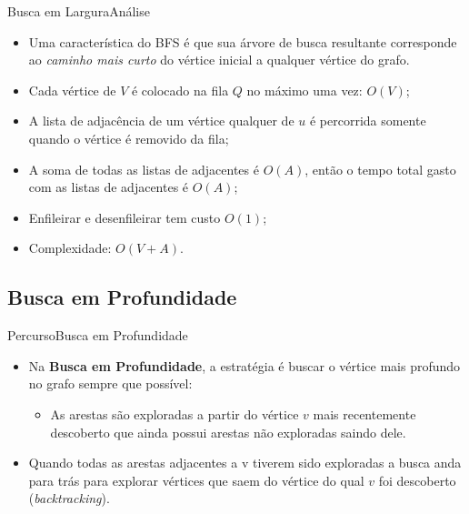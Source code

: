 \documentclass[aspectratio=169]{beamer}
\begin{document}

\begin{frame}{Busca em Largura}{Análise}
\begin{itemize}
\item Uma característica do BFS é que sua árvore de busca resultante corresponde ao {\it caminho mais curto} do vértice inicial a qualquer vértice do grafo.
\item Cada vértice de $V$ é colocado na fila $Q$ no máximo uma vez: $O(V)$;
\item A lista de adjacência de um vértice qualquer de $u$ é percorrida somente quando o vértice é removido da fila;
\item A soma de todas as listas de adjacentes é $O(A)$, então o tempo total gasto com as listas de adjacentes é $O(A)$;
\item Enfileirar e desenfileirar tem custo $O(1)$;
\item Complexidade: $O(V + A)$.
\end{itemize}
\end{frame}

\subsection{Busca em Profundidade}

\begin{frame}{Percurso}{Busca em Profundidade}
\begin{itemize}
\item Na {\bf Busca em Profundidade}, a estratégia é buscar o vértice mais profundo no grafo sempre que possível:
\begin{itemize}
\item As arestas são exploradas a partir do vértice $v$ mais recentemente descoberto que ainda possui arestas não exploradas saindo dele.
\end{itemize}
\item Quando todas as arestas adjacentes a v tiverem sido exploradas a busca anda para trás para explorar vértices que
saem do vértice do qual $v$ foi descoberto ({\it backtracking}).
\end{itemize}
\end{frame}
\end{document}
